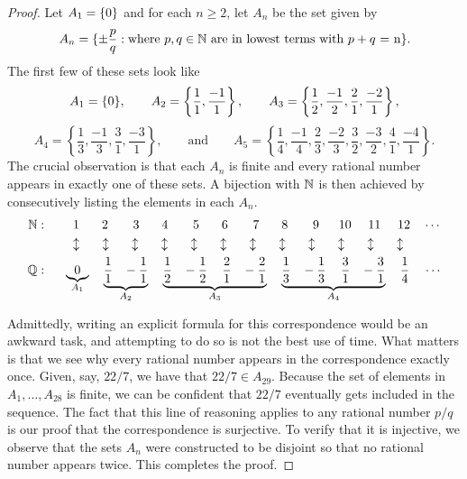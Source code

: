\documentclass[11pt,twoside=off,numbers=noenddot]{scrbook}
\begin{document}
\begin{proof}
    Let $A_1 = \{ 0 \}$ and for each $n \geq 2$, let $A_n$ be the set given by
    \[ A_n = \{ \pm\frac{p}{q} : \text{where $p, q \in \mathbb N$ are in lowest terms with $p + q$ = n} \}. \]
    The first few of these sets look like
    \[ A_1 = \{ 0 \}, \qquad A_2 = \left\{\frac{1}{1}, \frac{-1}{1}\right\}, \qquad A_3 = \left\{\frac{1}{2}, \frac{-1}{2}, \frac{2}{1}, \frac{-2}{1}\right\}, \]
    \[ A_4 = \left\{\frac{1}{3}, \frac{-1}{3}, \frac{3}{1}, \frac{-3}{1}\right\}, \qquad \text{and} \qquad A_5 = \left\{\frac{1}{4}, \frac{-1}{4}, \frac{2}{3}, \frac{-2}{3}, \frac{3}{2}, \frac{-3}{2}, \frac{4}{1}, \frac{-4}{1}\right\}. \]
    The crucial observation is that each $A_n$ is finite and every rational number appears in exactly one of these sets. A bijection with $\mathbb N$ is then achieved by consecutively listing the elements in each $A_n$.
    \begin{align*}
        \mathbb N : \phantom{.}\quad & \;\;\, 1 \quad \phantom{-}2 \quad \phantom{''''}3 \quad \phantom{-}4 \quad \phantom{''''}5 \quad \phantom{-}6 \quad \phantom{''''}7 \quad \phantom{-}8 \quad \phantom{''''}9 \quad\:\,\, 10 \quad\,\, 11 \quad\,\, 12 \quad \cdots \\
        & \:\: \updownarrow \quad \phantom{.}\updownarrow \quad \phantom{.}\updownarrow \quad \phantom{.}\updownarrow \quad \phantom{.}\updownarrow \quad \phantom{.}\updownarrow \quad \phantom{.}\updownarrow \quad \phantom{.}\updownarrow \quad \phantom{.}\updownarrow \quad \phantom{.}\updownarrow \quad \phantom{.}\updownarrow \quad \phantom{.}\updownarrow \\
        \mathbb Q : \phantom{.}\quad & \underbrace{0}_{A_1} \quad \underbrace{\frac{1}{1} \,\,\,\,\, -\frac{1}{1}}_{A_2} \quad \underbrace{\frac{1}{2} \,\,\,\,\, -\frac{1}{2} \quad\, \frac{2}{1} \,\,\,\,\, -\frac{2}{1}}_{A_3} \quad \underbrace{\frac{1}{3} \,\,\,\,\, -\frac{1}{3} \quad\, \frac{3}{1} \,\,\,\,\, -\frac{3}{1}}_{A_4} \quad \frac{1}{4} \:\:\:\:\: \cdots
    \end{align*}

    Admittedly, writing an explicit formula for this correspondence would be an awkward task, and attempting to do so is not the best use of time. What matters is that we see why every rational number appears in the correspondence exactly once. Given, say, $22/7$, we have that $22/7 \in A_{29}$. Because the set of elements in $A_1, \dots, A_{28}$ is finite, we can be confident that $22/7$ eventually gets included in the sequence. The fact that this line of reasoning applies to any rational number $p/q$ is our proof that the correspondence is surjective. To verify that it is injective, we observe that the sets $A_n$ were constructed to be disjoint so that no rational number appears twice. This completes the proof.
\end{proof}
\end{document}
